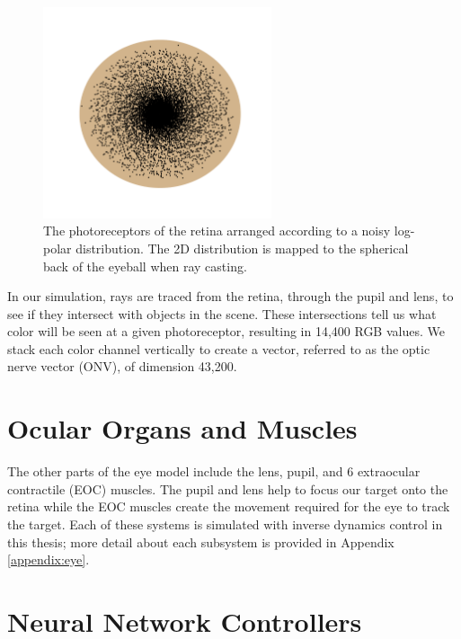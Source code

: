 \documentclass [MS] {UCLAthesis}
\begin{document}
\begin{figure}
    \centering
    \includegraphics[width=0.6\textwidth]{retina_log_polar}
    \caption[Photoreceptor distribution on the retina]{The photoreceptors of the retina arranged according to a noisy log-polar distribution. The 2D distribution is mapped to the spherical back of the eyeball when ray casting.}
    \label{fig:task_log_polar_retina}
\end{figure}

In our simulation, rays are traced from the retina, through the pupil and lens, to see if they intersect with objects in the scene. These intersections tell us what color will be seen at a given photoreceptor, resulting in 14,400 RGB values. We stack each color channel vertically to create a vector, referred to as the optic nerve vector (ONV), of dimension 43,200.


\section{Ocular Organs and Muscles}

The other parts of the eye model include the lens, pupil, and 6 extraocular contractile (EOC) muscles. The pupil and lens help to focus our target onto the retina while the EOC muscles create the movement required for the eye to track the target. Each of these systems is simulated with inverse dynamics control in this thesis; more detail about each subsystem is provided in Appendix \ref{appendix:eye}.


\section{Neural Network Controllers}
\end{document}
